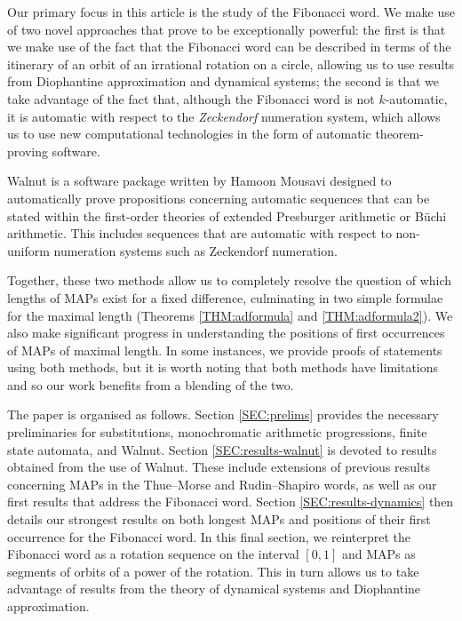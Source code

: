 \documentclass[10pt,a4paper,reqno]{amsart}
\newcommand{\walnut}{{\ttfamily Walnut}}
\begin{document}
Our primary focus in this article is the study of the Fibonacci word. We make use of two novel approaches that prove to be exceptionally powerful: the first is that we make use of the fact that the Fibonacci word can be described in terms of the itinerary of an orbit of an irrational rotation on a circle, allowing us to use results from Diophantine approximation and dynamical systems; the second is that we take advantage of the fact that, although the Fibonacci word is not $k$-automatic, it is automatic with respect to the \emph{Zeckendorf} numeration system, which allows us to use new computational technologies in the form of automatic theorem-proving software.

{\walnut} is a software package written by Hamoon Mousavi \cite{mous_walnut} designed to automatically prove propositions concerning automatic sequences that can be stated within the first-order theories of extended Presburger arithmetic or B\"uchi arithmetic. This includes sequences that are automatic with respect to non-uniform numeration systems such as Zeckendorf numeration.

 Together, these two methods allow us to completely resolve the question of which lengths of MAPs exist for a fixed difference, culminating in two simple formulae for the maximal length (Theorems \ref{THM:adformula} and \ref{THM:adformula2}). We also make significant progress in understanding the positions of first occurrences of  MAPs of maximal length. In some instances, we provide proofs of statements using both methods, but it is worth noting that both methods have limitations and so our work benefits from a blending of the two.

The paper is organised as follows. Section \ref{SEC:prelims} provides the necessary preliminaries for substitutions, monochromatic arithmetic progressions, finite state automata, and \walnut{}. Section \ref{SEC:results-walnut} is devoted to results obtained from the use of \walnut{}. These include extensions of previous results concerning MAPs in the Thue--Morse and Rudin--Shapiro words, as well as our first results that address the Fibonacci word.
Section \ref{SEC:results-dynamics} then details our strongest results on both longest MAPs and positions of their first occurrence for the Fibonacci word. In this final section, we reinterpret the Fibonacci word as a rotation sequence on the interval $[0,1]$ and MAPs as segments of orbits of a power of the rotation. This in turn allows us to take advantage of results from the theory of dynamical systems and Diophantine approximation.
\end{document}
